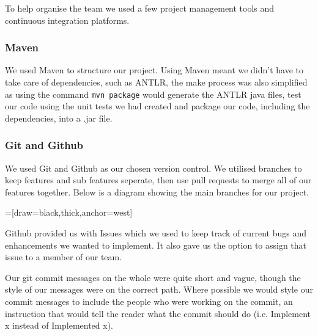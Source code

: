 \documentclass[11pt,a4paper]{article}
\begin{document}
To help organise the team we used a few project management tools and continuous integration platforms.

\subsubsection{Maven}
\label{subs:Maven}

We used Maven to structure our project. Using Maven meant we didn't have to take care of dependencies, such as ANTLR, the make process was also simplified as using the command \texttt{mvn package} would generate the ANTLR java files, test our code using the unit tests we had created and package our code, including the dependencies, into a .jar file.


\subsubsection{Git and Github}
\label{subs:Git and Github}

We used Git and Github as our chosen version control. We utilised branches to keep features and sub features seperate, then use pull requests to merge all of our features together. Below is a diagram showing the main branches for our project.

=[draw=black,thick,anchor=west]

Github provided us with Issues which we used to keep track of current bugs and enhancements we wanted to implement. It also gave us the option to assign that issue to a member of our team.

Our git commit messages on the whole were quite short and vague, though the style of our messages were on the correct path. Where possible we would style our commit messages to include the people who were working on the commit, an instruction that would tell the reader what the commit should do (i.e. Implement x instead of Implemented x).
\end{document}
